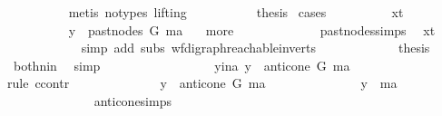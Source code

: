 \begin{isabellebody}
\ \ \ \ \ \ \ \ \isamarkupfalse%
\ {\isacharparenleft}{\kern0pt}metis\ {\isacharparenleft}{\kern0pt}no{\isacharunderscore}{\kern0pt}types{\isacharcomma}{\kern0pt}\ lifting{\isacharparenright}{\kern0pt}{\isacharparenright}{\kern0pt}\ \isanewline
\ \ \ \ \ \ \isamarkupfalse%
\ \isamarkupfalse%
\ {\isacharquery}{\kern0pt}thesis\ \isamarkupfalse%
{\isacharparenleft}{\kern0pt}cases{\isacharparenright}{\kern0pt}\isanewline
\ \ \ \ \ \ \ \ \isamarkupfalse%
\ x{\isacharunderscore}{\kern0pt}t\ \isanewline
\ \ \ \ \ \ \ \ \isamarkupfalse%
\ {\isachardoublequoteopen}y\ {\isasymin}\ past{\isacharunderscore}{\kern0pt}nodes\ G\ ma{\isachardoublequoteclose}\ \isamarkupfalse%
\ {}{\isacharparenleft}{\kern0pt}{}{\isacharparenright}{\kern0pt}\ more\ \isanewline
\ \ \ \ \ \ \ \ \ \ \ \ past{\isacharunderscore}{\kern0pt}nodes{\isachardot}{\kern0pt}simps\ \isamarkupfalse%
\ x{\isacharunderscore}{\kern0pt}t\isanewline
\ \ \ \ \ \ \ \ \ \ \isamarkupfalse%
\ {\isacharparenleft}{\kern0pt}simp\ add{\isacharcolon}{\kern0pt}\ subs\ wf{\isacharunderscore}{\kern0pt}digraph{\isachardot}{\kern0pt}reachable{}{\isacharunderscore}{\kern0pt}in{\isacharunderscore}{\kern0pt}verts{\isacharparenleft}{\kern0pt}{}{\isacharparenright}{\kern0pt}{\isacharparenright}{\kern0pt}\ \isanewline
\ \ \ \ \ \ \ \ \isamarkupfalse%
\ \isamarkupfalse%
\ {\isacharquery}{\kern0pt}thesis\ \isamarkupfalse%
\ both{\isacharunderscore}{\kern0pt}nin\ \isamarkupfalse%
\ simp\ \isanewline
\ \ \ \ \ \ \isamarkupfalse%
\isanewline
\ \ \ \ \ \ \ \ \isamarkupfalse%
\ y{\isacharunderscore}{\kern0pt}ina{\isacharcolon}{\kern0pt}\ {\isachardoublequoteopen}y\ {\isasymin}\ anticone\ G\ ma{\isachardoublequoteclose}\ \isanewline
\ \ \ \ \ \ \ \ \isamarkupfalse%
{\isacharparenleft}{\kern0pt}rule\ ccontr{\isacharparenright}{\kern0pt}\ \isanewline
\ \ \ \ \ \ \ \ \ \ \isamarkupfalse%
\ {\isachardoublequoteopen}{\isasymnot}\ y\ {\isasymin}\ anticone\ G\ ma\ {\isachardoublequoteclose}\isanewline
\ \ \ \ \ \ \ \ \ \ \isamarkupfalse%
\ \isamarkupfalse%
\ {\isachardoublequoteopen}y\ {\isacharequal}{\kern0pt}\ ma{\isachardoublequoteclose}\isanewline
\ \ \ \ \ \ \ \ \ \ \ \ \isamarkupfalse%
\ anticone{\isachardot}{\kern0pt}simps\ \isamarkupfalse%

\end{isabellebody}
